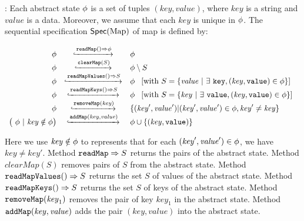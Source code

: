: Each abstract state $\phi$ is a set of tuples $(\mathit{key},\mathit{value})$, where $\mathit{key}$ is a string and $\mathit{value}$ is a data. Moreover, we assume that each $\mathit{key}$ is unique in $\phi$. The sequential specification $\mathsf{Spec}(\text{Map})$ of map is defined by:

\[
  \begin{array}{rcl}
    \abstate
    & \specarrow{\alabellong[\mathtt{readMap}]{}{ \abstate }{}}
    & \abstate\\ 
    \abstate
    & \specarrow{{\tt clearMap}(S)}
    & \abstate \setminus S\\ 
    \abstate
    & \specarrow{\alabellong[\mathtt{readMapValues}]{}{ S }{}}
    & \abstate\
      \begin{array}{c}
        [\text{with}\ S = \{ \mathit{value}\ \vert\ \exists\ \mathtt{key}, (\mathit{key},\mathtt{value}) \in \abstate \}] 
      \end{array}\\ 
    \abstate
    & \specarrow{\alabellong[\mathtt{readMapKeys}]{}{ S }{}}
    & \abstate\
      \begin{array}{c}
        [\text{with}\ S = \{ \mathit{key}\ \vert\ \exists\ \mathtt{value}, (\mathit{key},\mathtt{value}) \in \abstate \}]
      \end{array}\\
    \abstate
    & \specarrow{{\tt removeMap}(\mathit{key})}
    & \{ (\mathit{key}',\mathit{value}') \vert (\mathit{key}',\mathit{value}') \in \abstate, \mathit{key}' \neq \mathit{key} \}\\
    \big(\ \abstate\ |\ \mathit{key} \notin \abstate \big)
             & \specarrow{ \alabelshort[{\tt addMap}]{\mathit{key},\mathit{value}} }
    & \abstate \cup \{ (\mathit{key},\mathtt{value}) \}
  \end{array}
\]

Here we use $\mathit{key} \notin \phi$ to represents that for each $(\mathit{key}',\mathit{value}') \in \phi$, we have $\mathit{key} \neq \mathit{key}'$. Method ${\tt readMap}\Rightarrow S$ returns the pairs of the abstract state. Method $\mathit{clearMap}(S)$ removes pairs of $S$ from the abstract state. Method ${\tt readMapValues}()\Rightarrow S$ returns the set $S$ of values of the abstract state. Method ${\tt readMapKeys}()\Rightarrow S$ returns the set $S$ of keys of the abstract state. Method ${\tt removeMap}(\mathit{key}_1)$ removes the pair of key $\mathit{key}_1$ in the abstract state. Method ${\tt addMap}(\mathit{key},\mathit{value})$ adds the pair $(\mathit{key},\mathit{value})$ into the abstract state. 



